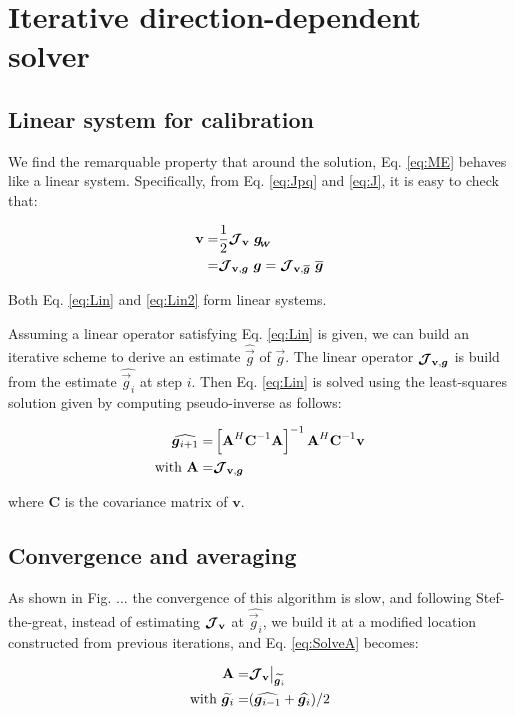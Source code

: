 \section{Iterative direction-dependent solver}
\label{sec:Solver}

\subsection{Linear system for calibration}


We find
the remarquable property that around the solution, Eq. \ref{eq:ME}
behaves like a linear system. Specifically, from Eq. \ref{eq:Jpq} and
\ref{eq:J}, it is easy to check that:

\begin{alignat}{2}
\label{eq:Lin}
\textbf{v}=&\frac{1}{2}\bm{\mathcal{J}}_{\textbf{v}}\ \bm{g_{\!_{W}}}\\
\label{eq:Lin2}
=&\bm{\mathcal{J}}_{\textbf{v},\bm{g}}\ \bm{g}=\bm{\mathcal{J}}_{\textbf{v},\bm{\overline{g}}}\ \overline{\bm{g}}
\end{alignat}



Both Eq. \ref{eq:Lin} and \ref{eq:Lin2} form linear systems.

\separator

Assuming a linear operator satisfying
Eq. \ref{eq:Lin} is given, we can build an iterative scheme to
derive an estimate $\widehat{\vec{g}}$ of $\vec{g}$. The linear operator
$\bm{\mathcal{J}}_{\textbf{v},\bm{g}}$ is build from the estimate
$\widehat{\vec{g}_i}$ at step $i$. Then Eq. \ref{eq:Lin} is solved
using the least-squares solution given by computing pseudo-inverse as follows:

\def\A{\textbf{A}}

\begin{alignat}{2}
\label{eq:Solve}
\widehat{\vec{g}_{i+1}}=&\left[\A^H\textbf{C}^{-1}\A\right]^{-1}\A^H\textbf{C}^{-1}\mathbf{v}\\
\label{eq:SolveA}
\text{with } \A=&\JVg
\end{alignat}

\noindent where \textbf{C} is the covariance matrix of $\mathbf{v}$.


\subsection{Convergence and averaging}

As shown in Fig. ... the convergence of this algorithm is slow, and
following Stef-the-great, instead of estimating $\bm{\mathcal{J}}_{\textbf{v}}$ at
$\widehat{\vec{g}_i}$, we build it at a modified location constructed
from previous iterations, and Eq. \ref{eq:SolveA} becomes:

\begin{alignat}{2}
\A=&\JV\big|_{\widetilde{\vec{g}_i}}\\
\text{with } \widetilde{\vec{g}_i}=&(\widehat{\vec{g}_{i-1}}+\widehat{\vec{g}_{i}})/2
\end{alignat}


